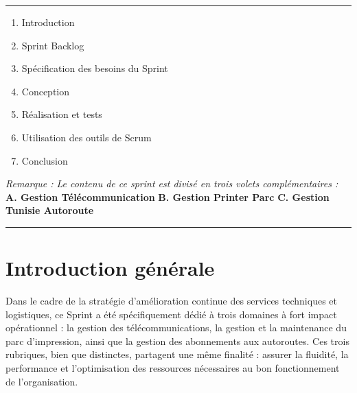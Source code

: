 \documentclass[a4paper,11pt]{report}
\begin{document}
\vspace{1cm}

\noindent
\textcolor{gray!70}{\rule{\textwidth}{0.4pt}}

\vspace{1cm}

\begin{enumerate}[label=\textbf{\large\arabic*.}, leftmargin=*, itemsep=1.2em]
    \item Introduction
    \item Sprint Backlog
    \item Spécification des besoins du Sprint
    \item Conception
    \item Réalisation et tests
    \item Utilisation des outils de Scrum
    \item Conclusion
\end{enumerate}

\vspace{0.5cm}

\noindent
\textit{\large Remarque : Le contenu de ce sprint est divisé en trois volets complémentaires :} \\
\textbf{\large A. Gestion Télécommunication} \hfill \textbf{\large B. Gestion Printer Parc} \hfill \textbf{\large C. Gestion Tunisie Autoroute}

\vspace{1cm}

\noindent
\textcolor{gray!70}{\rule{\textwidth}{0.4pt}}


\newpage
\setcounter{section}{0}


\section*{Introduction générale }

Dans le cadre de la stratégie d’amélioration continue des services techniques et logistiques, ce Sprint a été spécifiquement dédié à trois domaines à fort impact opérationnel : la gestion des télécommunications, la gestion et la maintenance du parc d’impression, ainsi que la gestion des abonnements aux autoroutes. Ces trois rubriques, bien que distinctes, partagent une même finalité : assurer la fluidité, la performance et l’optimisation des ressources nécessaires au bon fonctionnement de l'organisation.

\end{document}
